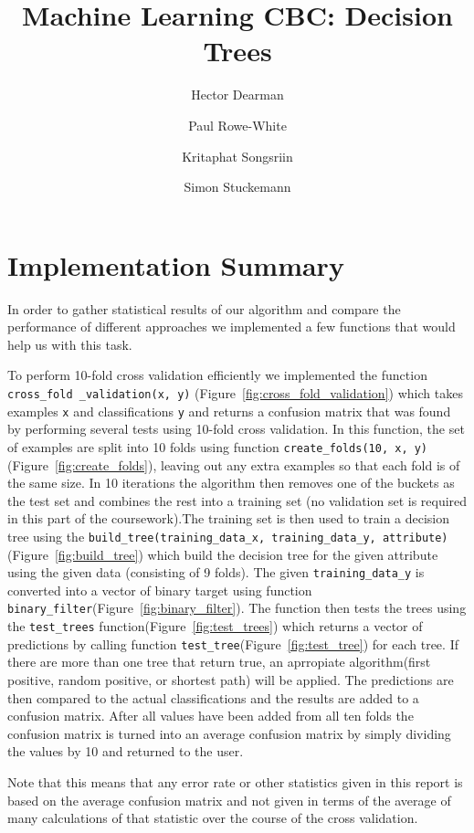\documentclass[10pt,a4paper]{article}
\author{Hector Dearman \and Paul Rowe-White \and Kritaphat Songsriin \and Simon Stuckemann}
\title{Machine Learning CBC: Decision Trees}
\begin{document}
\maketitle

\section{Implementation Summary}

In order to gather statistical results of our algorithm and compare the performance of different approaches we implemented a few functions that would help us with this task.

To perform 10-fold cross validation efficiently we implemented the function \texttt{cross\_fold \_validation(x, y)} (Figure~\ref{fig:cross_fold_validation}) which takes examples \texttt{x} and classifications \texttt{y} and returns a confusion matrix that was found by performing several tests using 10-fold cross validation. In this function, the set of examples are split into 10 folds using function {\tt create\_folds(10, x, y)}(Figure~\ref{fig:create_folds}), leaving out any extra examples so that each fold is of the same size. In 10 iterations the algorithm then removes one of the buckets as the test set and combines the rest into a training set (no validation set is required in this part of the coursework).The training set is then used to train a decision tree using the \texttt{build\_tree(training\_data\_x, training\_data\_y, attribute)}(Figure~\ref{fig:build_tree}) which build the decision tree for the given attribute using the given data (consisting of 9 folds). The given {\tt training\_data\_y} is converted into a vector of binary target using function {\tt binary\_filter}(Figure~\ref{fig:binary_filter}). The function then tests the trees using the \texttt{test\_trees} function(Figure~\ref{fig:test_trees}) which returns a vector of predictions by calling function {\tt test\_tree}(Figure~\ref{fig:test_tree}) for each tree. If there are more than one tree that return true, an aprropiate algorithm(first positive, random positive, or shortest path) will be applied. The predictions are then compared to the actual classifications and the results are added to a confusion matrix. After all values have been added from all ten folds the confusion matrix is turned into an average confusion matrix by simply dividing the values by 10 and returned to the user. 

Note that this means that any error rate or other statistics given in this report is based on the average confusion matrix and not given in terms of the average of many calculations of that statistic over the course of the cross validation.
\end{document}
